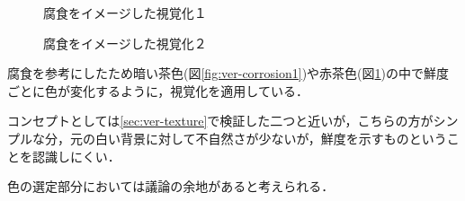 \begin{figure}[htbp]
  \begin{minipage}{0.5\hsize}
    \begin{center}
    \end{center}
    \caption{腐食をイメージした視覚化１}
    \label{fig:ver-corrosion1}
  \end{minipage}
  \begin{minipage}{0.5\hsize}
    \begin{center}
    \end{center}
    \caption{腐食をイメージした視覚化２}
    \label{fig:ver-corrosion2}
  \end{minipage}
\end{figure}

腐食を参考にしたため暗い茶色(図\ref{fig:ver-corrosion1})や赤茶色(図\ref{fig:ver-corrosion2})の中で鮮度ごとに色が変化するように，視覚化を適用している．

コンセプトとしては\ref{sec:ver-texture}で検証した二つと近いが，こちらの方がシンプルな分，元の白い背景に対して不自然さが少ないが，鮮度を示すものということを認識しにくい．

色の選定部分においては議論の余地があると考えられる．


